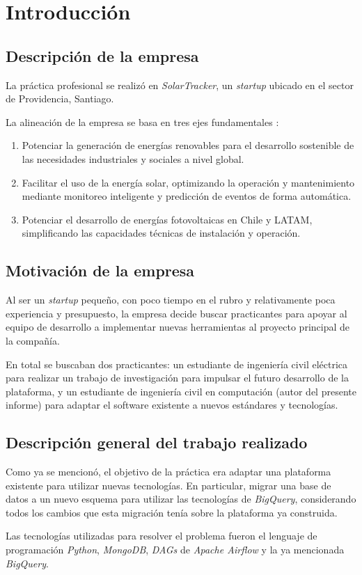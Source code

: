 \section{Introducción}
  \subsection{Descripción de la empresa}
    La práctica profesional se realizó en \textit{SolarTracker}, un \textit{startup} 
    ubicado en el sector de Providencia, Santiago.
    
    La alineación de la empresa se basa en tres ejes fundamentales 
    \autocite{solar-tracker}:

    \begin{enumerate}
      \item Potenciar la generación de energías renovables para el desarrollo sostenible 
        de las necesidades industriales y sociales a nivel global.
      \item Facilitar el uso de la energía solar, optimizando la operación y mantenimiento
        mediante monitoreo inteligente y predicción de eventos de forma automática.
      \item Potenciar el desarrollo de energías fotovoltaicas en Chile y LATAM, 
        simplificando las capacidades técnicas de instalación y operación.
    \end{enumerate}

  \subsection{Motivación de la empresa}
    Al ser un \textit{startup} pequeño, con poco tiempo en el rubro y relativamente poca experiencia
    y presupuesto, la empresa decide buscar practicantes para apoyar al equipo de desarrollo a 
    implementar nuevas herramientas al proyecto principal de la compañía.

    En total se buscaban dos practicantes: un estudiante de ingeniería civil eléctrica para realizar 
    un trabajo de investigación para impulsar el futuro desarrollo de la plataforma, y un estudiante 
    de ingeniería civil en computación (autor del presente informe) para adaptar el software 
    existente a nuevos estándares y tecnologías.

  \subsection{Descripción general del trabajo realizado}
    Como ya se mencionó, el objetivo de la práctica era adaptar una plataforma existente para 
    utilizar nuevas tecnologías.
    En particular, migrar una base de datos a un nuevo esquema para utilizar las tecnologías de 
    \textit{BigQuery}\autocite{bigquery}, considerando todos los cambios que esta migración tenía 
    sobre la plataforma ya construida.
    
    Las tecnologías utilizadas para resolver el problema fueron el lenguaje de programación 
    \textit{Python}\autocite{python}, \textit{MongoDB}\autocite{mongo}, \textit{DAGs} de 
    \textit{Apache Airflow}\autocite{dag} y la ya mencionada \textit{BigQuery}. 
%